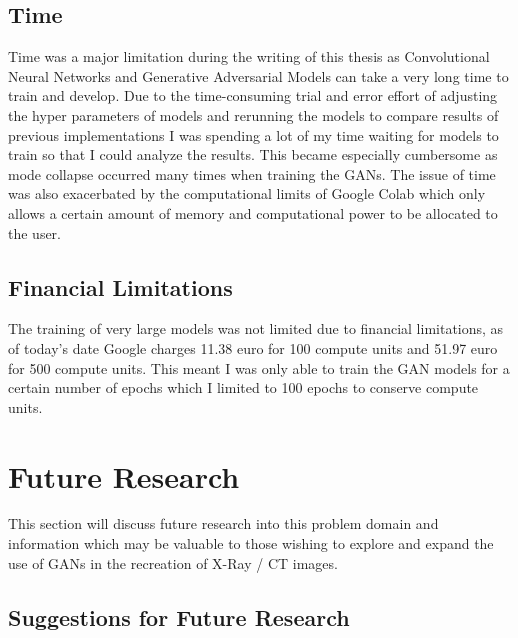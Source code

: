 \subsection{Time}
Time was a major limitation during the writing of this thesis as Convolutional Neural Networks and Generative Adversarial Models can take a very long time to train and develop.  Due to the time-consuming trial and error effort of adjusting the hyper parameters of models and rerunning the models to compare results of previous implementations I was spending a lot of my time waiting for models to train so that I could analyze the results.  This became especially cumbersome as mode collapse occurred many times when training the GANs.  The issue of time was also exacerbated by the computational limits of Google Colab which only allows a certain amount of memory and computational power to be allocated to the user. 
\subsection{Financial Limitations}
The training of very large models was not limited  due to financial limitations, as of today's date Google charges 11.38 euro for 100 compute units and 51.97 euro for 500 compute units.  This meant I was only able to train the GAN models for a certain number of epochs which I limited to 100 epochs to conserve compute units.
\section{Future Research}
This section will discuss future research into this problem domain and information which may be valuable to those wishing to explore and expand the use of GANs in the recreation of X-Ray / CT images. 
\subsection{Suggestions for Future Research}
